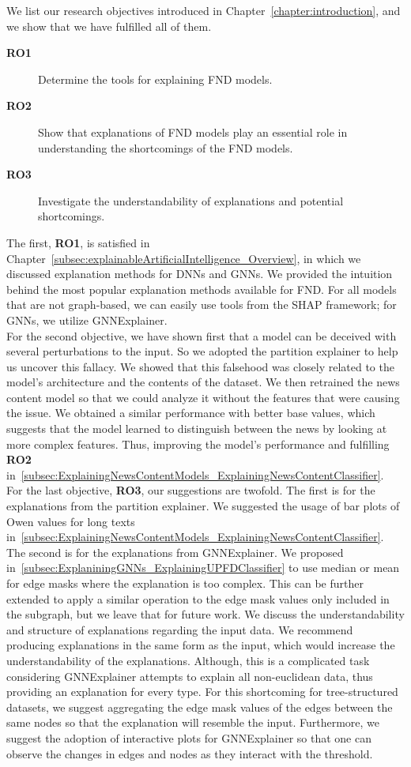 We list our research objectives introduced in Chapter~\ref{chapter:introduction}, and we show that we have fulfilled all of them.
\begin{description}
    \item[\textbf{RO1}] Determine the tools for explaining FND models.
    \item[\textbf{RO2}] Show that explanations of FND models play an essential role in understanding the shortcomings of the FND models.
    \item[\textbf{RO3}] Investigate the understandability of explanations and potential shortcomings.
\end{description}
The first, \textbf{RO1}, is satisfied in Chapter~\ref{subsec:explainableArtificialIntelligence_Overview}, in which we discussed explanation methods for DNNs and GNNs. We provided the intuition behind the most popular explanation methods available for FND. For all models that are not graph-based, we can easily use tools from the SHAP framework; for GNNs, we utilize GNNExplainer. \\
For the second objective, we have shown first that a model can be deceived with several perturbations to the input. So we adopted the partition explainer to help us uncover this fallacy. We showed that this falsehood was closely related to the  model's architecture and the contents of the dataset. We then retrained the news content model so that we could analyze it without the features that were causing the issue. We obtained a similar performance with better base values, which suggests that the model learned to distinguish between the news by looking at more complex features. Thus, improving the model's performance and fulfilling \textbf{RO2} in~\ref{subsec:ExplainingNewsContentModels_ExplainingNewsContentClassifier}.\\
For the last objective, \textbf{RO3}, our suggestions are twofold. The first is for the explanations from the partition explainer. We suggested the usage of bar plots of Owen values for long texts in~\ref{subsec:ExplainingNewsContentModels_ExplainingNewsContentClassifier}. The second is for the explanations from GNNExplainer. We proposed in~\ref{subsec:ExplaniningGNNs_ExplainingUPFDClassifier} to use median or mean for edge masks where the explanation is too complex. This can be further extended to apply a similar operation to the edge mask values only included in the subgraph, but we leave that for future work. We discuss the understandability and structure of explanations regarding the input data. We recommend producing explanations in the same form as the input, which would increase the understandability of the explanations. Although, this is a complicated task considering GNNExplainer attempts to explain all non-euclidean data, thus providing an explanation for every type. For this shortcoming for tree-structured datasets, we suggest aggregating the edge mask values of the edges between the same nodes so that the explanation will resemble the input. Furthermore, we suggest the adoption of interactive plots for GNNExplainer so that one can observe the changes in edges and nodes as they interact with the threshold.\\
